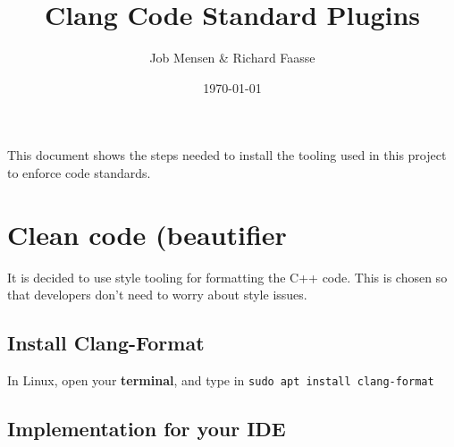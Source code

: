 \documentclass[10pt]{article}
\title{Clang Code Standard Plugins}
\author{Job Mensen \& Richard Faasse}
\date{\today}
\begin{document}
\maketitle
\noindent This document shows the steps needed to install the tooling used in this project to enforce code standards.

\section{Clean code (beautifier}
It is decided to use style tooling for formatting the C++ code. This is chosen so that developers don't need to worry about style issues.

\subsection*{Install Clang-Format}
In Linux, open your \textbf{terminal}, and type in \texttt{sudo apt install clang-format}

\subsection*{Implementation for your IDE}
\end{document}
